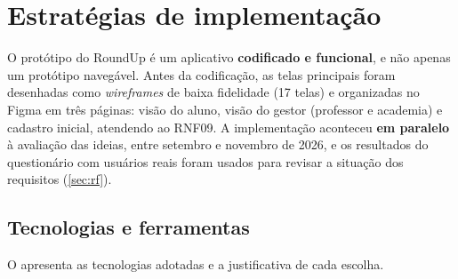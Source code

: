 
\chapter{Estratégias de implementação}
\label{cap:implementacao}

O protótipo do RoundUp é um aplicativo \textbf{codificado e funcional},
e não apenas um protótipo navegável. Antes da codificação, as telas
principais foram desenhadas como \textit{wireframes} de baixa fidelidade
(17 telas) e organizadas no Figma em três páginas: visão do aluno, visão
do gestor (professor e academia) e cadastro inicial, atendendo ao RNF09.
A implementação aconteceu \textbf{em paralelo} à avaliação das ideias,
entre setembro e novembro de 2026, e os resultados do questionário com
usuários reais foram usados para revisar a situação dos requisitos
(\autoref{sec:rf}).

\section{Tecnologias e ferramentas}

O  apresenta as tecnologias adotadas e a
justificativa de cada escolha.

